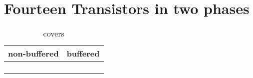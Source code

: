 \section{Fourteen Transistors in two phases}

\begin{table}[ht]
\centering
\caption*{covers}

\begin{tabular}{cc}
    \toprule
    non-buffered & buffered \\
    \midrule

    \nameref{cell:AAOI331} & \nameref{cell:AAO331} \\
    \nameref{cell:OOAI331} & \nameref{cell:OOA331} \\
    \nameref{cell:AAAOI322} & \nameref{cell:AAAO322} \\
    \nameref{cell:OOOAI322} & \nameref{cell:OOOA322}

\end{tabular}

\end{table}

 
 
 
 

